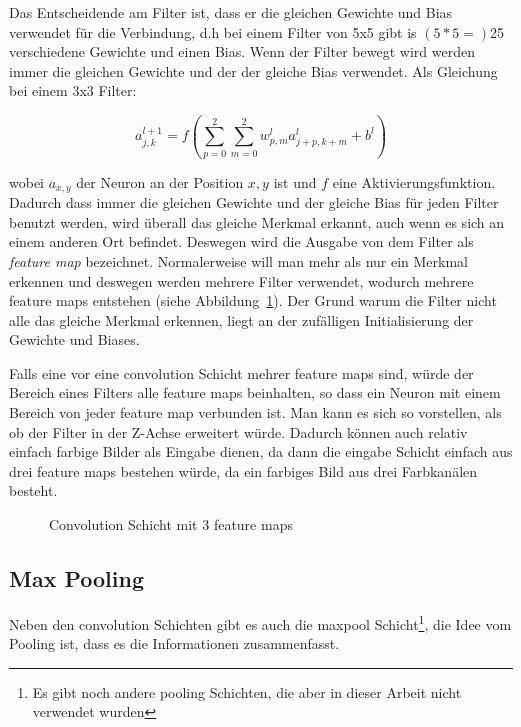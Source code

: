 \documentclass[12pt,a4paper]{report}
\begin{document}
Das Entscheidende am Filter ist, dass er die gleichen Gewichte und Bias verwendet für die Verbindung, d.h bei einem
Filter von 5x5 gibt is $(5*5=)$25 verschiedene Gewichte und einen Bias.
Wenn der Filter bewegt wird werden immer die gleichen Gewichte und der der gleiche Bias verwendet.
Als Gleichung bei einem 3x3 Filter:

\[a^{l+1}_{j,k} = f\left(\sum_{p=0}^{2}\sum_{m=0}^{2}w^l_{p,m}a^l_{j+p,k+m} + b^l\right)\]

wobei $a_{x, y}$ der Neuron an der Position $x, y$ ist und $f$ eine Aktivierungsfunktion.
Dadurch dass immer die gleichen Gewichte und der gleiche Bias für jeden Filter benutzt werden,
wird überall das gleiche Merkmal erkannt, auch wenn es sich an einem anderen Ort befindet.
Deswegen wird die Ausgabe von dem Filter als \textit{feature map} bezeichnet.
Normalerweise will man mehr als nur ein Merkmal erkennen und deswegen werden mehrere Filter verwendet,
wodurch mehrere feature maps entstehen (siehe Abbildung~\ref{fig:conv4}).
Der Grund warum die Filter nicht alle das gleiche Merkmal erkennen, liegt an der zufälligen Initialisierung der Gewichte und Biases.

Falls eine vor eine convolution  Schicht mehrer feature maps sind, würde der Bereich eines Filters alle feature maps beinhalten,
so dass ein Neuron mit einem Bereich von jeder feature map verbunden ist.
Man kann es sich so vorstellen, als ob der Filter in der Z-Achse erweitert würde.
Dadurch können auch relativ einfach farbige Bilder als Eingabe dienen,
da dann die eingabe Schicht einfach aus drei feature maps bestehen würde, da ein farbiges Bild aus drei Farbkanälen besteht.

\begin{figure}[h]%
    \centering
{}
    \caption{Convolution Schicht mit 3 feature maps}%
    \label{fig:conv4}
\end{figure}

\subsection{Max Pooling}
Neben den convolution Schichten gibt es auch die maxpool Schicht\footnote{Es gibt noch andere pooling Schichten, die aber in dieser Arbeit nicht verwendet wurden},
die Idee vom Pooling ist, dass es die Informationen zusammenfasst.
\end{document}
